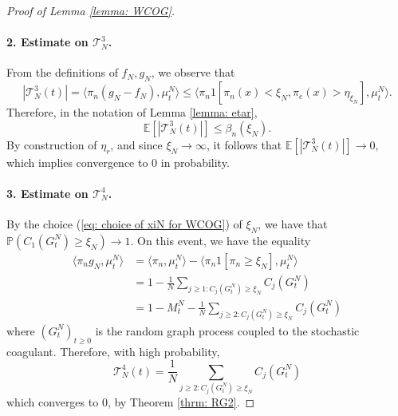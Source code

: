 \begin{proof}[Proof of Lemma \ref{lemma: WCOG}]
   \paragraph{2. Estimate on $\mathcal{T}^3_N$.} From the definitions of $f_N, g_N$, we observe that \begin{equation}
       |\mathcal{T}^3_N(t)|=\langle \pi_n(g_N-f_N), \mu^N_t\rangle \le  \langle \pi_n 1[\pi_n(x)<\xi_N, \pi_e(x)>\eta_{\xi_N}], \mu^N_t\rangle.
   \end{equation} Therefore, in the notation of Lemma \ref{lemma: etar}, \begin{equation}
       \mathbb{E}\left[|\mathcal{T}^3_N(t)|\right] \leq \beta_n(\xi_N).
   \end{equation} By construction of $\eta_r$, and since $\xi_N \rightarrow \infty$, it follows that $\mathbb{E}[ |\mathcal{T}^3_N(t)|] \rightarrow 0,$ which implies convergence to $0$ in probability.
       \paragraph{3. Estimate on $\mathcal{T}^4_N$.} By the choice (\ref{eq: choice of xiN for WCOG}) of $\xi_N$, we have that $\mathbb{P}( C_1(G^N_t)\geq \xi_N)\rightarrow 1.$ On this event, we have the equality \begin{equation}
           \begin{split}
               \langle \pi_n g_N, \mu^N_t\rangle &=\langle \pi_n, \mu^N_t\rangle - \langle \pi_n 1[\pi_n\geq \xi_N], \mu^N_t\rangle \\[2ex] & = 1-\frac{1}{N}\sum_{j\geq 1: C_j(G^N_t)\ge \xi_N} C_j(G^N_t) \\[2ex] & = 1-M^N_t-\frac{1}{N}\sum_{j\ge 2:C_j(G^N_t)\ge \xi_N} C_j(G^N_t) 
           \end{split} 
       \end{equation} where $(G^N_t)_{t\geq 0}$ is the random graph process coupled to the stochastic coagulant. Therefore, with high probability, \begin{equation} \mathcal{T}^4_N(t) = \frac{1}{N} \sum_{j\ge 2:C_j(G^N_t)\ge \xi_N} C_j(G^N_t) \end{equation} which converges to $0$, by Theorem \ref{thrm: RG2}.

\end{proof}
